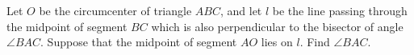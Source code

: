 Let $O$ be the circumcenter of triangle $ABC$, and let $l$ be the line passing through the midpoint of segment $BC$ which is also perpendicular to the bisector of angle $ \angle BAC $. Suppose that the midpoint of segment $AO$ lies on $l$. Find $ \angle BAC $.